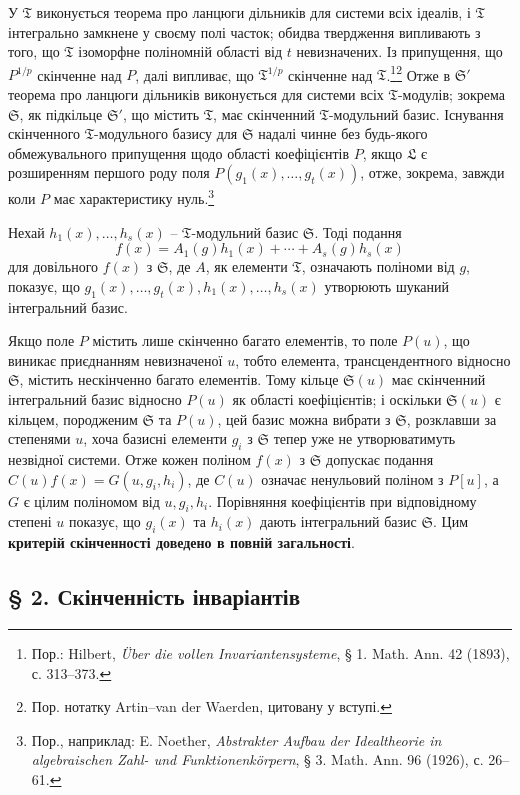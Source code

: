 \documentclass[11pt]{article}
\begin{document}
У $\mathfrak T$ виконується теорема про ланцюги дільників для системи всіх ідеалів, і $\mathfrak T$ інтегрально замкнене у своєму полі часток; обидва твердження випливають з того, що $\mathfrak T$ ізоморфне поліномній області від $t$ невизначених. Із припущення, що $P^{1/p}$ скінченне над $P$, далі випливає, що $\mathfrak T^{1/p}$ скінченне над $\mathfrak T$.\footnote{Пор.: Hilbert, \emph{Über die vollen Invariantensysteme}, § 1. Math. Ann. 42 (1893), с. 313--373.}\footnote{Пор. нотатку Artin--van der Waerden, цитовану у вступі.} Отже в $\mathfrak S'$ теорема про ланцюги дільників виконується для системи всіх $\mathfrak T$-модулів; зокрема $\mathfrak S$, як підкільце $\mathfrak S'$, що містить $\mathfrak T$, має скінченний $\mathfrak T$-модульний базис. Існування скінченного $\mathfrak T$-модульного базису для $\mathfrak S$ надалі чинне без будь-якого обмежувального припущення щодо області коефіцієнтів $P$, якщо $\mathfrak L$ є розширенням першого роду поля $P(g_1(x),\ldots,g_t(x))$, отже, зокрема, завжди коли $P$ має характеристику нуль.\footnote{Пор., наприклад: E. Noether, \emph{Abstrakter Aufbau der Idealtheorie in algebraischen Zahl- und Funktionenkörpern}, § 3. Math. Ann. 96 (1926), с. 26--61.}

Нехай $h_1(x),\ldots,h_s(x)$ -- $\mathfrak T$-модульний базис $\mathfrak S$. Тоді подання
\[
 f(x)=A_1(g)h_1(x)+\cdots+A_s(g)h_s(x)
\]
для довільного $f(x)$ з $\mathfrak S$, де $A$, як елементи $\mathfrak T$, означають поліноми від $g$, показує, що $g_1(x),\ldots,g_t(x),h_1(x),\ldots,h_s(x)$ утворюють шуканий інтегральний базис.

Якщо поле $P$ містить лише скінченно багато елементів, то поле $P(u)$, що виникає приєднанням невизначеної $u$, тобто елемента, трансцендентного відносно $\mathfrak S$, містить нескінченно багато елементів. Тому кільце $\mathfrak S(u)$ має скінченний інтегральний базис відносно $P(u)$ як області коефіцієнтів; і оскільки $\mathfrak S(u)$ є кільцем, породженим $\mathfrak S$ та $P(u)$, цей базис можна вибрати з $\mathfrak S$, розклавши за степенями $u$, хоча базисні елементи $g_i$ з $\mathfrak S$ тепер уже не утворюватимуть незвідної системи. Отже кожен поліном $f(x)$ з $\mathfrak S$ допускає подання $C(u)f(x)=G(u,g_i,h_i)$, де $C(u)$ означає ненульовий поліном з $P[u]$, а $G$ є цілим поліномом від $u,g_i,h_i$. Порівняння коефіцієнтів при відповідному степені $u$ показує, що $g_i(x)$ та $h_i(x)$ дають інтегральний базис $\mathfrak S$. Цим \textbf{критерій скінченності доведено в повній загальності}.

\subsection*{§ 2. Скінченність інваріантів}
\end{document}

